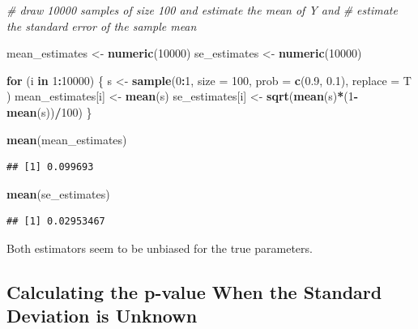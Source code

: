\documentclass[]{book}
\newenvironment{Shaded}{\begin{snugshade}}{\end{snugshade}}
\newcommand{\KeywordTok}[1]{\textcolor[rgb]{0.13,0.29,0.53}{\textbf{#1}}}
\newcommand{\DataTypeTok}[1]{\textcolor[rgb]{0.13,0.29,0.53}{#1}}
\newcommand{\DecValTok}[1]{\textcolor[rgb]{0.00,0.00,0.81}{#1}}
\newcommand{\FloatTok}[1]{\textcolor[rgb]{0.00,0.00,0.81}{#1}}
\newcommand{\StringTok}[1]{\textcolor[rgb]{0.31,0.60,0.02}{#1}}
\newcommand{\CommentTok}[1]{\textcolor[rgb]{0.56,0.35,0.01}{\textit{#1}}}
\newcommand{\ControlFlowTok}[1]{\textcolor[rgb]{0.13,0.29,0.53}{\textbf{#1}}}
\newcommand{\OperatorTok}[1]{\textcolor[rgb]{0.81,0.36,0.00}{\textbf{#1}}}
\newcommand{\NormalTok}[1]{#1}
\theoremstyle{definition}
\theoremstyle{definition}
\theoremstyle{definition}
\theoremstyle{remark}
\begin{document}
\begin{Shaded}
\begin{Highlighting}[]
\CommentTok{# draw 10000 samples of size 100 and estimate the mean of Y and}
\CommentTok{# estimate the standard error of the sample mean}

\NormalTok{mean_estimates <-}\StringTok{ }\KeywordTok{numeric}\NormalTok{(}\DecValTok{10000}\NormalTok{)}
\NormalTok{se_estimates <-}\StringTok{ }\KeywordTok{numeric}\NormalTok{(}\DecValTok{10000}\NormalTok{)}

\ControlFlowTok{for}\NormalTok{ (i }\ControlFlowTok{in} \DecValTok{1}\OperatorTok{:}\DecValTok{10000}\NormalTok{) \{}
\NormalTok{  s <-}\StringTok{ }\KeywordTok{sample}\NormalTok{(}\DecValTok{0}\OperatorTok{:}\DecValTok{1}\NormalTok{, }
              \DataTypeTok{size =} \DecValTok{100}\NormalTok{,  }
              \DataTypeTok{prob =} \KeywordTok{c}\NormalTok{(}\FloatTok{0.9}\NormalTok{, }\FloatTok{0.1}\NormalTok{),}
              \DataTypeTok{replace =}\NormalTok{ T}
\NormalTok{              )}
\NormalTok{  mean_estimates[i] <-}\StringTok{ }\KeywordTok{mean}\NormalTok{(s)}
\NormalTok{  se_estimates[i] <-}\StringTok{ }\KeywordTok{sqrt}\NormalTok{(}\KeywordTok{mean}\NormalTok{(s)}\OperatorTok{*}\NormalTok{(}\DecValTok{1}\OperatorTok{-}\KeywordTok{mean}\NormalTok{(s))}\OperatorTok{/}\DecValTok{100}\NormalTok{)}
\NormalTok{\}}

\KeywordTok{mean}\NormalTok{(mean_estimates)}
\end{Highlighting}
\end{Shaded}

\begin{verbatim}
## [1] 0.099693
\end{verbatim}

\begin{Shaded}
\begin{Highlighting}[]
\KeywordTok{mean}\NormalTok{(se_estimates)}
\end{Highlighting}
\end{Shaded}

\begin{verbatim}
## [1] 0.02953467
\end{verbatim}

Both estimators seem to be unbiased for the true parameters.

\subsection*{Calculating the p-value When the Standard Deviation is
Unknown}\label{calculating-the-p-value-when-the-standard-deviation-is-unknown}
\end{document}
